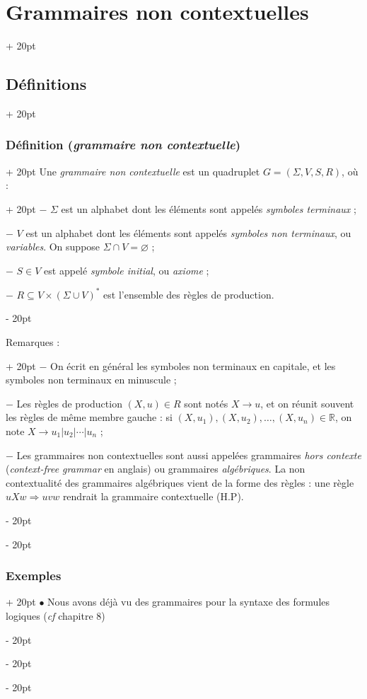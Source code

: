 \documentclass[a4paper, 12pt, twoside]{article}
\newcommand{\R}{\mathbb{R}} %
\newcommand{\lr}[1]{\left( #1 \right)}
\newcommand{\ind}[1][20pt]{\advance\leftskip + #1}
\newcommand{\deind}[1][20pt]{\advance\leftskip - #1}
\newenvironment{indt}[2][20pt]{#2 \par \ind[#1]}{\par \deind} %
\begin{document}
\begin{indt}{\section{Grammaires non contextuelles}}
\begin{indt}{\subsection{Définitions}}
            \begin{indt}{\subsubsection{Définition (\textit{grammaire non contextuelle})}}
                \begin{indt}{Une \emph{grammaire non contextuelle} est un quadruplet $G = \lr{\Sigma, V, S, R}$, où :}
                    $-$ $\Sigma$ est un alphabet dont les éléments sont appelés \emph{symboles terminaux} ;

                    $-$ $V$ est un alphabet dont les éléments sont appelés \emph{symboles non terminaux}, ou \emph{variables}.
                    On suppose $\Sigma \cap V = \varnothing$ ;

                    $-$ $S \in V$ est appelé \emph{symbole initial}, ou \emph{axiome} ;

                    $-$ $R \subseteq V \times \lr{\Sigma \cup V}^*$ est l'ensemble des règles de production.
                \end{indt}

                \vspace{12pt}
                
                \begin{indt}{Remarques :}
                    $-$ On écrit en général les symboles non terminaux en capitale, et les symboles non terminaux en minuscule ;

                    $-$ Les règles de production $(X, u) \in R$ sont notés $X \rightarrow u$, et on réunit souvent les règles de même membre gauche : si $(X, u_1), (X, u_2), \ldots, (X, u_n) \in \R$, on note $X \rightarrow u_1 | u_2 | \cdots | u_n$ ;

                    $-$ Les grammaires non contextuelles sont aussi appelées grammaires \textit{hors contexte} (\textit{context-free grammar} en anglais) ou grammaires \textit{algébriques}.
                    La non contextualité des grammaires algébriques vient de la forme des règles : une règle $uXw \Rightarrow uvw$ rendrait la grammaire contextuelle (H.P).
                \end{indt}
            \end{indt}

            \vspace{12pt}
            
            \begin{indt}{\subsubsection{Exemples}}
                $\bullet$ Nous avons déjà vu des grammaires pour la syntaxe des formules logiques (\textit{cf} chapitre 8)


\end{indt}
\end{indt}
\end{indt}
\end{document}
